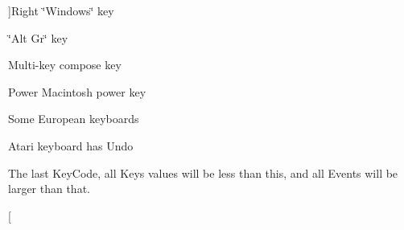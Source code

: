 \begin{Desc}
\begin{description}
{}]Right \char`\"{}Windows\char`\"{} key \item[{\em 
\hypertarget{classMetaCode_a7390e6f58e25c0ce377bba4e63081b24a79956c29fd4e16e82532643471b79aaa}{
KEY\_\-MODE}
\label{d7/d72/classMetaCode_a7390e6f58e25c0ce377bba4e63081b24a79956c29fd4e16e82532643471b79aaa}
}]\char`\"{}Alt Gr\char`\"{} key \item[{\em 
\hypertarget{classMetaCode_a7390e6f58e25c0ce377bba4e63081b24a386e42ccb1fbb297d9b672ed8064871c}{
KEY\_\-COMPOSE}
\label{d7/d72/classMetaCode_a7390e6f58e25c0ce377bba4e63081b24a386e42ccb1fbb297d9b672ed8064871c}
}]Multi-\/key compose key \item[{\em 
\hypertarget{classMetaCode_a7390e6f58e25c0ce377bba4e63081b24ad546e765e064929fb89556bd5f581756}{
KEY\_\-POWER}
\label{d7/d72/classMetaCode_a7390e6f58e25c0ce377bba4e63081b24ad546e765e064929fb89556bd5f581756}
}]Power Macintosh power key \item[{\em 
\hypertarget{classMetaCode_a7390e6f58e25c0ce377bba4e63081b24a9c203a1b83ec1bb0a29bbcd71fcc6363}{
KEY\_\-EURO}
\label{d7/d72/classMetaCode_a7390e6f58e25c0ce377bba4e63081b24a9c203a1b83ec1bb0a29bbcd71fcc6363}
}]Some European keyboards \item[{\em 
\hypertarget{classMetaCode_a7390e6f58e25c0ce377bba4e63081b24a0bbef750535825d14bef6d8369dfe61f}{
KEY\_\-UNDO}
\label{d7/d72/classMetaCode_a7390e6f58e25c0ce377bba4e63081b24a0bbef750535825d14bef6d8369dfe61f}
}]Atari keyboard has Undo \item[{\em 
\hypertarget{classMetaCode_a7390e6f58e25c0ce377bba4e63081b24aa27e8c7d5dc3cc1d726ae82aef44d21c}{
INPUTEVENT\_\-FIRST}
\label{d7/d72/classMetaCode_a7390e6f58e25c0ce377bba4e63081b24aa27e8c7d5dc3cc1d726ae82aef44d21c}
}]The last KeyCode, all Keys values will be less than this, and all Events will be larger than that. \item[{\em 
}
\end{description}
\end{Desc}
